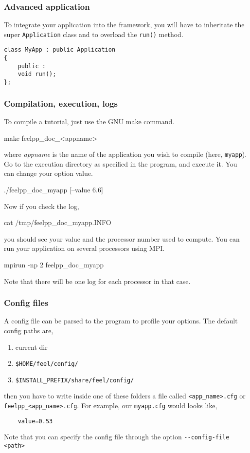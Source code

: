 \subsubsection{Advanced application}

To integrate your application into the \feel framework, you will 
have to inheritate the super \lstinline!Application! class and to overload
the \lstinline!run()! method.
%
\vspace{2mm}
\begin{lstlisting}
class MyApp : public Application
{
    public :
	void run();
};
\end{lstlisting}
\vspace{2mm}
%

\subsubsection{Compilation, execution, logs}

To compile a tutorial, just use the GNU make command.
%
\begin{unixcom}
    make feelpp_doc_<appname>    
\end{unixcom}
%
where \textit{appname} is the name of the application you wish to
compile (here, \lstinline!myapp!).
Go to the execution directory as specified in the program,
and execute it. You can change your option value.
%
\begin{unixcom}
    ./feelpp_doc_myapp [--value 6.6]
\end{unixcom}
%
Now if you check the log,
%
\begin{unixcom}
    cat /tmp/feelpp_doc_myapp.INFO
\end{unixcom}
%
you should see your value and the processor number used to compute.
You can run your application on several processors using MPI.
%
\begin{unixcom}
    mpirun -np 2 feelpp_doc_myapp
\end{unixcom}
%
Note that there will be one log for each processor in that case.


\subsubsection{Config files}

A config file can be parsed to the program to profile your options.
The default config paths are,
\begin{enumerate}
    \item current dir
    \item \verb|$HOME/feel/config/|
    \item \verb|$INSTALL_PREFIX/share/feel/config/|
\end{enumerate}
then you have to write inside one of these folders a file called
\lstinline!<app_name>.cfg! or \lstinline!feelpp_<app_name>.cfg!.
For example, our \lstinline!myapp.cfg! would looks like,
%
\vspace{2mm}
\begin{lstlisting}
    value=0.53
\end{lstlisting}
\vspace{2mm}
%
Note that you can specify the config file through the option \lstinline!--config-file <path>!

